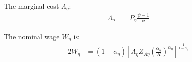\documentclass[../thesis.tex]{subfiles}
\begin{document}
\begin{comment}
	Substitute \ref{eq_v2:reg-ss-q1} in \ref{eq_v2:reg-ss-total-expense-level-2}:
	\begin{align}
		Q_{2} &= Q_{1} \frac{\omega_{11}^{\omega_{11}} (1 - \omega_{11})^{1 - \omega_{11}}}{\omega_{21}^{\omega_{21}} (1 -\omega_{21})^{1 -\omega_{21}}} \tag{\ref{eq_v2:reg-ss-total-expense-level-2}} \implies \\
		Q_{2} &= \frac{P_{1} \theta_{P}^{1 - \omega_{11}}}{\omega_{21}^{\omega_{21}} (1 - \omega_{21})^{1 - \omega_{21}}} \label{eq_v2:reg-ss-q2}
	\end{align}
\end{comment}

The marginal cost $\Lambda_{\eta}$:
\begin{align}
	\Lambda_{\eta} &= P_{\eta} \frac{\psi-1}{\psi} \label{eq_v2:reg-ss-marginal-cost}
\end{align}

The nominal wage $W_{\eta}$ is:
\begin{alignat}{2}
	W_{\eta} &= \left( 1 - \alpha_{\eta} \right) \left[ \Lambda_{\eta} Z_{A\eta} \left( \frac{\alpha_{\eta}}{R} \right)^{\alpha_{\eta}} \right]^{\frac{1}{1 - \alpha_{\eta}}} \label{eq_v2:reg-ss-nominal-wage}
\end{alignat}

\begin{comment}
	Substitute \ref{eq_v2:reg-ss-nominal-wage} in \ref{eq_v2:reg-ss-int-good-firm-MC-2} for the technology level of region 2, $Z_{A2}$:
	\begin{align}
		\Lambda_{\eta} &= \frac{1}{Z_{A\eta}} \left( \frac{R_K}{{\alpha_{\eta}}} \right)^{{\alpha_{\eta}}} \left( \frac{W}{1-\alpha_{\eta}} \right)^{1-\alpha_{\eta}} \implies \tag{\ref{eq_v2:reg-ss-int-good-firm-MC-2}} \\
		Z_{A2} &= \frac{1}{\Lambda_{}} \left( \frac{R_K}{{\alpha_{\eta}}} \right)^{{\alpha_{\eta}}} \left( \frac{W}{1-\alpha_{\eta}} \right)^{1-\alpha_{\eta}} \label{eq_v2:reg-ss-za2}
	\end{align}
\end{comment}

\end{document}
